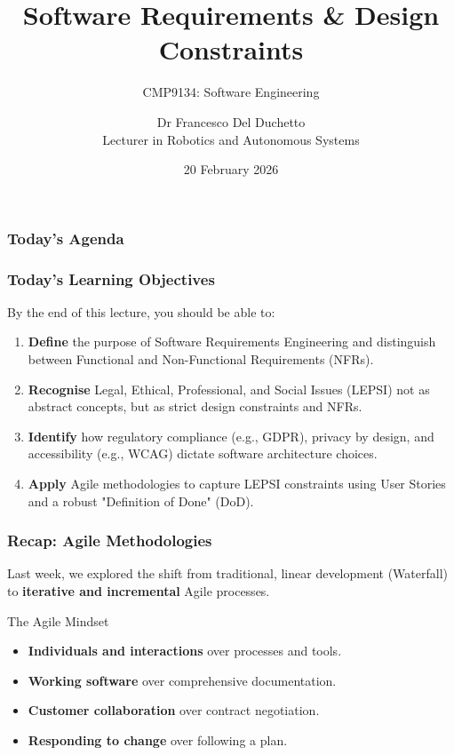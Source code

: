\documentclass[xcolor=table]{beamer}
\title[CMP9134 - Week 3]{Software Requirements \& Design Constraints}
\subtitle{CMP9134: Software Engineering}
\author[Francesco Del Duchetto]{Dr Francesco Del Duchetto\\Lecturer in Robotics and Autonomous Systems}
\institute[University of Lincoln]{University of Lincoln}
\date{20 February 2026}
\begin{document}
\begin{frame}
    \titlepage
\end{frame}

\begin{frame}
    \frametitle{Today's Agenda}
    \tableofcontents
\end{frame}

\begin{frame}
    \frametitle{Today's Learning Objectives}
    By the end of this lecture, you should be able to:
    \begin{enumerate}
        \item \textbf{Define} the purpose of Software Requirements Engineering and distinguish between Functional and Non-Functional Requirements (NFRs).
        \item \textbf{Recognise} Legal, Ethical, Professional, and Social Issues (LEPSI) not as abstract concepts, but as strict design constraints and NFRs.
        \item \textbf{Identify} how regulatory compliance (e.g., GDPR), privacy by design, and accessibility (e.g., WCAG) dictate software architecture choices.
        \item \textbf{Apply} Agile methodologies to capture LEPSI constraints using User Stories and a robust "Definition of Done" (DoD).
    \end{enumerate}
\end{frame}

\begin{frame}
    \frametitle{Recap: Agile Methodologies}
    Last week, we explored the shift from traditional, linear development (Waterfall) to \textbf{iterative and incremental} Agile processes.
    
    


    
    \begin{block}{The Agile Mindset}
        \begin{itemize}
            \item \textbf{Individuals and interactions} over processes and tools.
            \item \textbf{Working software} over comprehensive documentation.
            \item \textbf{Customer collaboration} over contract negotiation.
            \item \textbf{Responding to change} over following a plan.
        \end{itemize}
    \end{block}
\end{frame}
\end{document}
